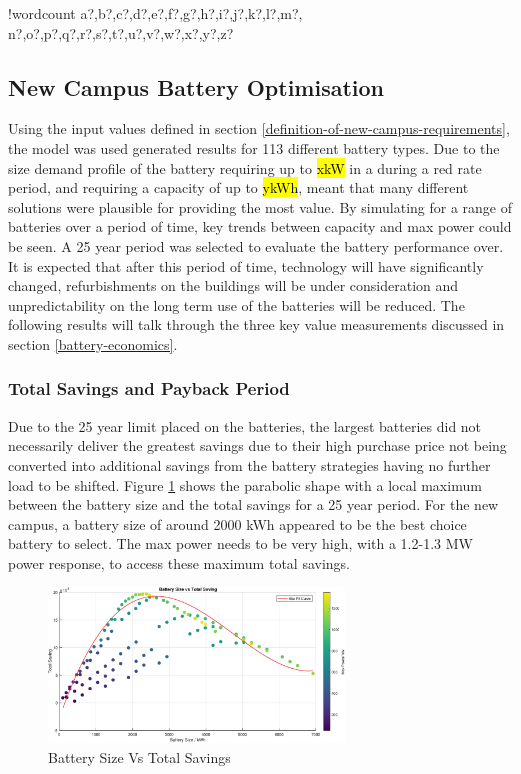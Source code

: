 \documentclass[fontsize=9.5pt]{extarticle}
\numberwithin{figure}{section} %
\newcounter{words}
\newenvironment{counted}{%
  \setcounter{words}{0}
  \SearchList!{wordcount}{\stepcounter{words}}
    {a?,b?,c?,d?,e?,f?,g?,h?,i?,j?,k?,l?,m?,
    n?,o?,p?,q?,r?,s?,t?,u?,v?,w?,x?,y?,z?}
  \UndoBoundary{'}
  \SearchOrder{p;}}{%
  \StopSearching}
\begin{document}
\begin{counted}
\subsection{New Campus Battery
Optimisation}\label{new-campus-battery-optimisation}

Using the input values defined in section
\ref{definition-of-new-campus-requirements}, the model was used
generated results for 113 different battery types. Due to the size
demand profile of the battery requiring up to \hl{xkW} in a during a red
rate period, and requiring a capacity of up to \hl{ykWh}, meant that
many different solutions were plausible for providing the most value. By
simulating for a range of batteries over a period of time, key trends
between capacity and max power could be seen. A 25 year period was
selected to evaluate the battery performance over. It is expected that
after this period of time, technology will have significantly changed,
refurbishments on the buildings will be under consideration and
unpredictability on the long term use of the batteries will be reduced.
The following results will talk through the three key value measurements
discussed in section \ref{battery-economics}.

\subsubsection{Total Savings and Payback
Period}\label{total-savings-and-payback-period}

Due to the 25 year limit placed on the batteries, the largest batteries
did not necessarily deliver the greatest savings due to their high
purchase price not being converted into additional savings from the
battery strategies having no further load to be shifted. Figure
\ref{SRTS2} shows the parabolic shape with a local maximum between the
battery size and the total savings for a 25 year period. For the new
campus, a battery size of around 2000 kWh appeared to be the best choice
battery to select. The max power needs to be very high, with a 1.2-1.3
MW power response, to access these maximum total savings.

\begin{figure}[H]
 \centering
 \includegraphics[trim = 0 0 0 0, clip, width=0.7\textwidth]{SRTS2.eps}
 \caption{Battery Size Vs Total Savings}
 \label{SRTS2}
\end{figure}


\end{counted}
\end{document}
